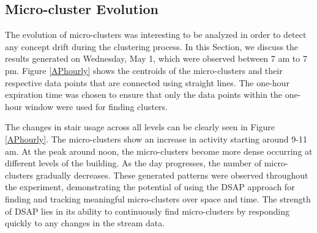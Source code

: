 \subsection{Micro-cluster Evolution}
 
The evolution of micro-clusters was interesting to be analyzed in order to detect any concept drift during the clustering process. In this Section, we discuss the results generated on Wednesday, May 1, which were observed between 7 am to 7 pm. Figure \ref{APhourly} shows the centroids of the micro-clusters and their respective data points that are connected using straight lines. The one-hour expiration time was chosen to ensure that only the data points within the one-hour window were used for finding clusters. 

The changes in stair usage across all levels can be clearly seen in Figure \ref{APhourly}. The micro-clusters show an increase in activity starting around 9-11 am. At the peak around noon, the micro-clusters become more dense occurring at different levels of the building. As the day progresses, the number of micro-clusters gradually decreases. These generated patterns were observed throughout the experiment, demonstrating the potential of using the DSAP approach for finding and tracking meaningful micro-clusters over space and time. The strength of DSAP lies in its ability to continuously find micro-clusters by responding quickly to any changes in the stream data.

   
